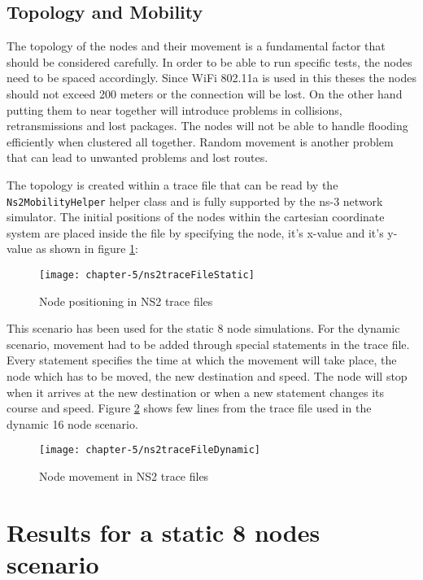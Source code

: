 \subsection{Topology and Mobility}

The topology of the nodes and their movement is a fundamental factor that should be considered carefully. In order to be able to run specific tests, the nodes need to be spaced accordingly. Since WiFi 802.11a is used in this theses the nodes should not exceed 200 meters or the connection will be lost. On the other hand putting them to near together will introduce problems in collisions, retransmissions and lost packages. The nodes will not be able to handle flooding efficiently when clustered all together. Random movement is another problem that can lead to unwanted problems and lost routes.
 
The topology is created within a trace file that can be read by the \texttt{Ns2MobilityHelper} helper class and is fully supported by the ns-3 network simulator. The initial positions of the nodes within the cartesian coordinate system are placed inside the file by specifying the node, it's x-value and it's y-value as shown in figure \ref{fig:ns2traceFileStatic}:

\begin{figure}[H]
  \centering
  \texttt{[image: chapter-5/ns2traceFileStatic]}
  \caption{Node positioning in NS2 trace files}
  \label{fig:ns2traceFileStatic}
\end{figure}

\clearpage

This scenario has been used for the static 8 node simulations. For the dynamic scenario, movement had to be added through special statements in the trace file. Every statement specifies the time at which the movement will take place, the node which has to be moved, the new destination and speed. The node will stop when it arrives at the new destination or when a new statement changes its course and speed. Figure \ref{fig:ns2traceFileDynamic} shows few lines from the trace file used in the dynamic 16 node scenario.

\begin{figure}[H]
  \centering
  \texttt{[image: chapter-5/ns2traceFileDynamic]}
  \caption{Node movement in NS2 trace files}
  \label{fig:ns2traceFileDynamic}
\end{figure}

\clearpage

\section{Results for a static 8 nodes scenario}

